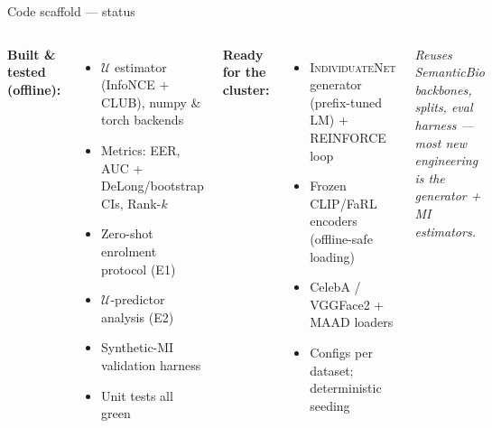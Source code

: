 \documentclass[aspectratio=169,10pt]{beamer}
\newcommand{\U}{\mathcal{U}}
\newcommand{\method}{\textsc{IndividuateNet}}
\begin{document}
\begin{frame}{Code scaffold --- status}
  \begin{columns}[T]
      \textbf{Built \& tested (offline):}
      \begin{itemize}\small
        \item $\U$ estimator (InfoNCE + CLUB), numpy \& torch backends
        \item Metrics: EER, AUC + DeLong/bootstrap CIs, Rank-$k$
        \item Zero-shot enrolment protocol (E1)
        \item $\U$-predictor analysis (E2)
        \item Synthetic-MI validation harness
        \item Unit tests all green
      \end{itemize}
      \textbf{Ready for the cluster:}
      \begin{itemize}\small
        \item \method{} generator (prefix-tuned LM) + REINFORCE loop
        \item Frozen CLIP/FaRL encoders (offline-safe loading)
        \item CelebA / VGGFace2 + MAAD loaders
        \item Configs per dataset; deterministic seeding
      \end{itemize}
      \vspace{0.4em}
      \footnotesize\emph{Reuses SemanticBio backbones, splits, eval harness ---
      most new engineering is the generator + MI estimators.}
  \end{columns}
\end{frame}
\end{document}
